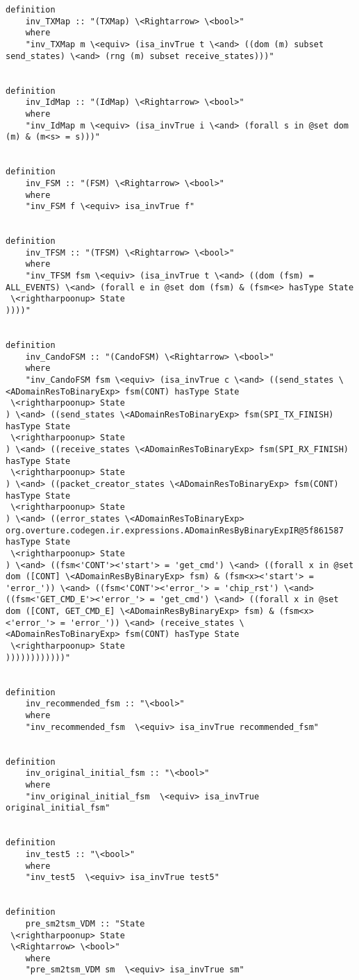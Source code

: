\begin{lstlisting}[language=Isabelle]
definition
	inv_TXMap :: "(TXMap) \<Rightarrow> \<bool>"
    where
    "inv_TXMap m \<equiv> (isa_invTrue t \<and> ((dom (m) subset send_states) \<and> (rng (m) subset receive_states)))"


definition
	inv_IdMap :: "(IdMap) \<Rightarrow> \<bool>"
    where
    "inv_IdMap m \<equiv> (isa_invTrue i \<and> (forall s in @set dom (m) & (m<s> = s)))"


definition
	inv_FSM :: "(FSM) \<Rightarrow> \<bool>"
    where
    "inv_FSM f \<equiv> isa_invTrue f"


definition
	inv_TFSM :: "(TFSM) \<Rightarrow> \<bool>"
    where
    "inv_TFSM fsm \<equiv> (isa_invTrue t \<and> ((dom (fsm) = ALL_EVENTS) \<and> (forall e in @set dom (fsm) & (fsm<e> hasType State
 \<rightharpoonup> State
))))"


definition
	inv_CandoFSM :: "(CandoFSM) \<Rightarrow> \<bool>"
    where
    "inv_CandoFSM fsm \<equiv> (isa_invTrue c \<and> ((send_states \<ADomainResToBinaryExp> fsm(CONT) hasType State
 \<rightharpoonup> State
) \<and> ((send_states \<ADomainResToBinaryExp> fsm(SPI_TX_FINISH) hasType State
 \<rightharpoonup> State
) \<and> ((receive_states \<ADomainResToBinaryExp> fsm(SPI_RX_FINISH) hasType State
 \<rightharpoonup> State
) \<and> ((packet_creator_states \<ADomainResToBinaryExp> fsm(CONT) hasType State
 \<rightharpoonup> State
) \<and> ((error_states \<ADomainResToBinaryExp> org.overture.codegen.ir.expressions.ADomainResByBinaryExpIR@5f861587 hasType State
 \<rightharpoonup> State
) \<and> ((fsm<'CONT'><'start'> = 'get_cmd') \<and> ((forall x in @set dom ([CONT] \<ADomainResByBinaryExp> fsm) & (fsm<x><'start'> = 'error_')) \<and> ((fsm<'CONT'><'error_'> = 'chip_rst') \<and> ((fsm<'GET_CMD_E'><'error_'> = 'get_cmd') \<and> ((forall x in @set dom ([CONT, GET_CMD_E] \<ADomainResByBinaryExp> fsm) & (fsm<x><'error_'> = 'error_')) \<and> (receive_states \<ADomainResToBinaryExp> fsm(CONT) hasType State
 \<rightharpoonup> State
))))))))))))"


definition
	inv_recommended_fsm :: "\<bool>"
    where
    "inv_recommended_fsm  \<equiv> isa_invTrue recommended_fsm"


definition
	inv_original_initial_fsm :: "\<bool>"
    where
    "inv_original_initial_fsm  \<equiv> isa_invTrue original_initial_fsm"


definition
	inv_test5 :: "\<bool>"
    where
    "inv_test5  \<equiv> isa_invTrue test5"


definition
	pre_sm2tsm_VDM :: "State
 \<rightharpoonup> State
 \<Rightarrow> \<bool>"
    where
    "pre_sm2tsm_VDM sm  \<equiv> isa_invTrue sm"



\end{lstlisting}
